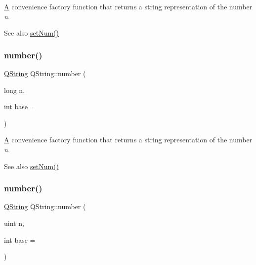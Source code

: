 \mbox{\hyperlink{class_a}{A}} convenience factory function that returns a string representation of the number {\itshape n}.

\begin{DoxySeeAlso}{See also}
\mbox{\hyperlink{class_q_string_accbb06e3141abc70c20ccee59a20b1f5}{set\+Num()}} 
\end{DoxySeeAlso}
\mbox{\label{class_q_string_ac6eeb4543ef6aa8e4b165ed947039cd8}} 
\subsubsection{\texorpdfstring{number()}{number()}\hspace{0.1cm}{\footnotesize\ttfamily [3/5]}}
{\footnotesize\ttfamily \mbox{\hyperlink{class_q_string}{Q\+String}} Q\+String\+::number (\begin{DoxyParamCaption}\item[{long}]{n,  }\item[{int}]{base = {} }\end{DoxyParamCaption})\hspace{0.3cm}{\ttfamily [static]}}

\mbox{\hyperlink{class_a}{A}} convenience factory function that returns a string representation of the number {\itshape n}.

\begin{DoxySeeAlso}{See also}
\mbox{\hyperlink{class_q_string_accbb06e3141abc70c20ccee59a20b1f5}{set\+Num()}} 
\end{DoxySeeAlso}
\mbox{\label{class_q_string_a38addca1148502aad34f7ee85eb1d344}} 
\subsubsection{\texorpdfstring{number()}{number()}\hspace{0.1cm}{\footnotesize\ttfamily [4/5]}}
{\footnotesize\ttfamily \mbox{\hyperlink{class_q_string}{Q\+String}} Q\+String\+::number (\begin{DoxyParamCaption}\item[{uint}]{n,  }\item[{int}]{base = {} }\end{DoxyParamCaption})\hspace{0.3cm}{\ttfamily [static]}}

